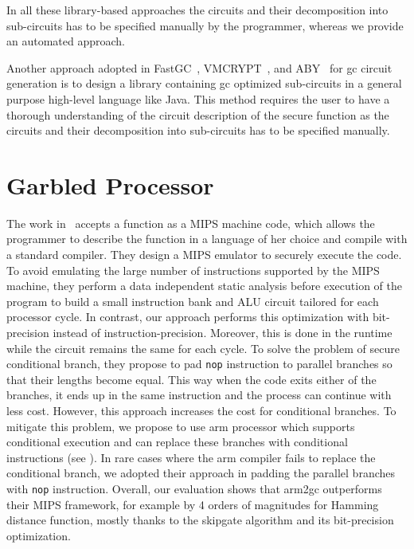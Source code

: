 In all these library-based approaches the circuits and their decomposition into sub-circuits has to be specified manually by the programmer, whereas we provide an automated approach.


Another approach adopted in FastGC~\cite{huang2011faster, henecka2013faster}, VMCRYPT~\cite{malka2011vmcrypt}, and ABY~\cite{demmler2015aby} for \acrshort{gc} circuit generation is to design a library containing \acrshort{gc} optimized sub-circuits in a general purpose high-level language like Java.
This method requires the user to have a thorough understanding of the circuit description of the secure function as the circuits and their decomposition into sub-circuits has to be specified manually.


\section{Garbled Processor}\label{sec:related-processor}
The work in~\cite{wang2016secure} accepts a function as a MIPS machine code, which allows the programmer to describe the function in a language of her choice and compile with a standard compiler.
They design a MIPS emulator to securely execute the code.
To avoid emulating the large number of instructions supported by the MIPS machine, they perform a data independent static analysis before execution of the program to build a small instruction bank and ALU circuit tailored for each processor cycle.
In contrast, our approach performs this optimization with bit-precision instead of instruction-precision.
Moreover, this is done in the runtime while the circuit remains the same for each cycle.
To solve the problem of secure conditional branch, they propose to pad \texttt{nop} instruction to parallel branches so that their lengths become equal.
This way when the code exits either of the branches, it ends up in the same instruction and the process can continue with less cost.
However, this approach increases the cost for conditional branches.
To mitigate this problem, we propose to use \gls{arm} processor which supports conditional execution and can replace these branches with conditional instructions (see ).
In rare cases where the \gls{arm} compiler fails to replace the conditional branch, we adopted their approach in padding the parallel branches with \texttt{nop} instruction.
Overall, our evaluation shows that \gls{arm2gc} outperforms their MIPS framework, for example by 4 orders of magnitudes for Hamming distance function, mostly thanks to the \gls{skipgate} algorithm and its bit-precision optimization.

